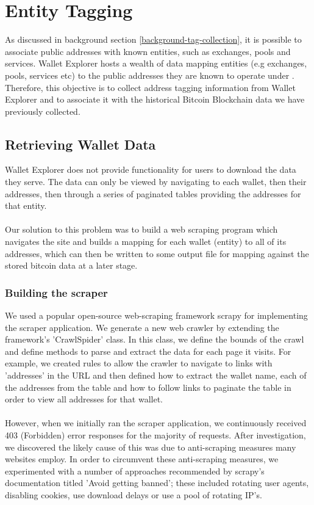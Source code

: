 \chapter{Entity Tagging}\label{section-entity-tagging}
As discussed in background section \ref{background-tag-collection}, it is possible to associate public addresses with known entities, such as exchanges, pools and services. Wallet Explorer hosts a wealth of data mapping entities (e.g exchanges, pools, services etc) to the public addresses they are known to operate under \cite{RefWorks:doc:5c4b26f3e4b0ea619646d513}. Therefore, this objective is to collect address tagging information from Wallet Explorer and to associate it with the historical Bitcoin Blockchain data we have previously collected.

\section{Retrieving Wallet Data}\label{design:fetch-entity-data}
Wallet Explorer does not provide functionality for users to download the data they serve. The data can only be viewed by navigating to each wallet, then their addresses, then through a series of paginated tables providing the addresses for that entity.
\\\\
Our solution to this problem was to build a web scraping program which navigates the site and builds a mapping for each wallet (entity) to all of its addresses, which can then be written to some output file for mapping against the stored bitcoin data at a later stage. 

\subsection{Building the scraper}
We used a popular open-source web-scraping framework scrapy for implementing the scraper application. We generate a new web crawler by extending the framework's 'CrawlSpider' class. In this class, we define the bounds of the crawl and define methods to parse and extract the data for each page it visits. For example, we created rules to allow the crawler to navigate to links with 'addresses' in the URL and then defined how to extract the wallet name,  each of the addresses from the table and how to follow links to paginate the table in order to view all addresses for that wallet. 
\\\\
However, when we initially ran the scraper application, we continuously received 403 (Forbidden) error responses for the majority of requests.  After investigation, we discovered the likely cause of this was due to anti-scraping measures many websites employ. In order to circumvent these anti-scraping measures, we experimented with a number of approaches recommended by scrapy's documentation titled 'Avoid getting banned'; these included rotating user agents, disabling cookies, use download delays or use a pool of rotating IP's. 

